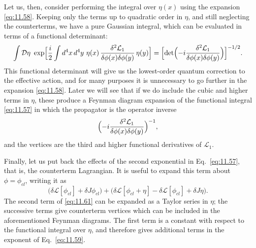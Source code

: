 Let us, then, consider performing the integral over $\eta(x)$ using the
expansion \eqref{eq:11.58}.  Keeping only the terms up to quadratic order in
$\eta$, and still neglecting the counterterms, we have a pure Gaussian
integral, which can be evaluated in terms of a functional determinant:
\begin{equation}
  \int \mathcal{D}\eta\ \exp\Bigl[ \frac{i}{2}\int d^4x\,d^4y\
    \eta(x)\,\frac{\delta^2\mathcal{L}_1}{\delta\phi(x)\delta\phi(y)}\,
    \eta(y) \Bigr] = \Bigl[ \det\Bigl( -i\frac{\delta^2\mathcal{L}_1}
      {\delta\phi(x)\delta\phi(y)} \Bigr) \Bigr]^{-1/2} .
  \label{eq:11.59}
\end{equation}
This functional determinant will give us the lowest-order quantum correction
to the effective action, and for many purposes it is unnecessary to go further
in the expansion \eqref{eq:11.58}.  Later we will see that if we do include
the cubic and higher terms in $\eta$, these produce a Feynman diagram
expansion of the functional integral \eqref{eq:11.57} in which the propagator
is the operator inverse
\begin{equation}
  \Bigl( -i\frac{\delta^2\mathcal{L}_1}{\delta\phi(x)\delta\phi(y)}
    \Bigr)^{-1} ,
  \label{eq:11.60}
\end{equation}
and the vertices are the third and higher functional derivatives of
$\mathcal{L}_1$.

Finally, let us put back the effects of the second exponential in
Eq.~\eqref{eq:11.57}, that is, the counterterm Lagrangian.  It is useful to
expand this term about $\phi = \phi_{cl}$, writing it as
\begin{equation}
  \bigl( \delta\mathcal{L}[\phi_{cl}] + \delta J\phi_{cl} \bigr)
  + \bigl( \delta\mathcal{L}[\phi_{cl}+\eta] - \delta\mathcal{L}[\phi_{cl}]
    + \delta J\eta \bigr) .
  \label{eq:11.61}
\end{equation}
The second term of \eqref{eq:11.61} can be expanded as a Taylor series in
$\eta$; the successive terms give counterterm vertices which can be included
in the aforementioned Feynman diagrams.  The first term is a constant with
respect to the functional integral over $\eta$, and therefore gives additional
terms in the exponent of Eq.~\eqref{eq:11.59}.


